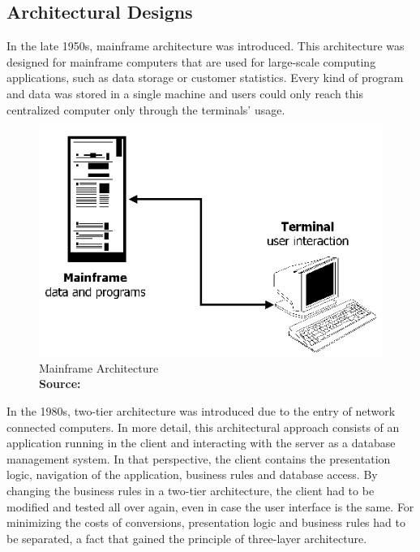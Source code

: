 \newpage
\subsection{Architectural Designs}
In the late 1950s, mainframe architecture was introduced. This architecture was designed for mainframe computers that are used for large-scale computing applications, such as data storage or customer statistics. Every kind of program and data was stored in a single machine and users could only reach this centralized computer only through the terminals' usage.

\begin{figure}[h!]
	\begin{center}
		\includegraphics[scale=0.45]{images/mainframe.jpg}
	\end{center}
	\caption{
		Mainframe Architecture
		\\
		\textbf{Source:} \cite{Reference3}
	}
\end{figure}

In the 1980s, two-tier architecture was introduced due to the entry of network connected computers. In more detail, this architectural approach consists of an application running in the client and interacting with the server as a database management system. In that perspective, the client contains the presentation logic, navigation of the application, business rules and database access. By changing the business rules in a two-tier architecture, the client had to be modified and tested all over again, even in case the user interface is the same. For minimizing the costs of conversions, presentation logic and business rules had to be separated, a fact that gained the principle of three-layer architecture.

